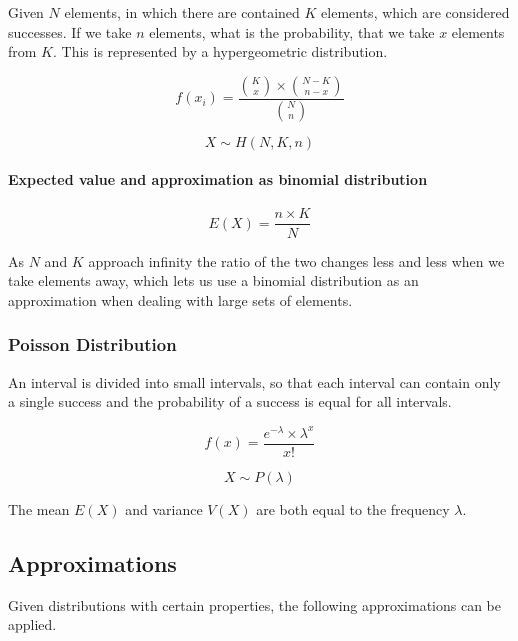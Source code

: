 \documentclass[a4paper, 10pt]{article}
\begin{document}
	Given \(N\) elements, in which there are contained \(K\) elements, which are considered successes. If we take \(n\) elements, what is the probability, that we take \(x\) elements from \(K\).
	This is represented by a hypergeometric distribution.

	\begin{equation*}
		f(x_i)=\frac{\binom{K}{x}\times \binom{N-K}{n-x}}{\binom{N}{n}}
	\end{equation*}

	\begin{equation*}
		X\sim H(N, K, n)
	\end{equation*}

	\paragraph{Expected value and approximation as binomial distribution}

	\begin{equation*}
		E(X)=\frac{n\times K}{N}
	\end{equation*}

	\noindent As \(N\) and \(K\) approach infinity the ratio of the two changes less and less when we take elements away, which lets us use a binomial distribution as an approximation when dealing with large sets of elements.

	\subsubsection{Poisson Distribution}

	An interval is divided into small intervals, so that each interval can contain only a single success and the probability of a success is equal for all intervals.

	\begin{equation*}
		f(x)=\frac{e^{-\lambda}\times \lambda ^x}{x!}
	\end{equation*}

	\begin{equation*}
		X\sim P(\lambda)
	\end{equation*}

	\noindent The mean \(E(X)\) and variance \(V(X)\) are both equal to the frequency \(\lambda\).

	\subsection{Approximations}

	Given distributions with certain properties, the following approximations can be applied.
\end{document}
